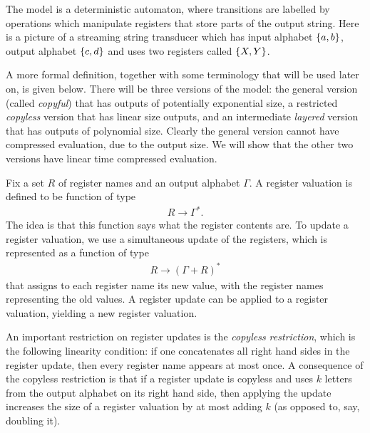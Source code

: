 \documentclass{article}
\begin{document}
The model is a deterministic automaton, where transitions are labelled by operations which manipulate registers that store parts of the output string.  Here is a picture of a streaming string transducer which has input alphabet $\{a,b\}$, output alphabet $\{c,d\}$ and uses two registers called $\{X,Y\}$.

A more formal definition, together with some terminology that will be used later on, is given below. There will be three versions of the model: the general  version (called \emph{copyful}) that  has outputs of potentially exponential size, a restricted \emph{copyless} version that has linear size outputs, and an intermediate \emph{layered} version that has outputs of polynomial size. Clearly the general version cannot have compressed evaluation, due to the output size. We will show that the other two versions have linear time compressed evaluation.


Fix a set $R$ of register names and an output alphabet $\Gamma$.   A register valuation is defined to be  function of type 
\begin{align*}
    R \to \Gamma^*.
\end{align*}
The idea is that this function  says what the register contents are.
To update a register valuation, we use  a simultaneous update of the registers, which is represented as a function of type 
\begin{align*}
    R \to (\Gamma + R)^*
\end{align*}
that assigns to each register name its new value, with the register names representing the old values. 
A register update can be applied to a register valuation, yielding a new register valuation. 

An important restriction on register updates is the \emph{copyless restriction}, which is the following linearity condition: if one concatenates all right hand sides in the register update, then every register name appears at most once. A consequence of the copyless restriction is that if a register update is copyless and uses $k$ letters from the output alphabet on its right hand side, then applying the update increases the size of a register valuation by at most adding  $k$ (as opposed to, say, doubling it).
\end{document}
